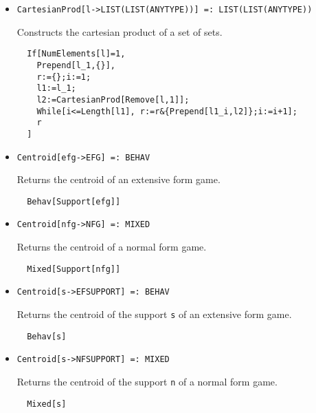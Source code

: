 \begin{itemize}
\ed


\item{}
\protect \large \begin{verbatim}
CartesianProd[l->LIST(LIST(ANYTYPE))] =: LIST(LIST(ANYTYPE)) 
\end{verbatim}\normalsize

\bd 
Constructs the cartesian product of a set of sets.  
\begin{verbatim}
  If[NumElements[l]=1,
    Prepend[l_1,{}],
    r:={};i:=1;
    l1:=l_1;
    l2:=CartesianProd[Remove[l,1]];
    While[i<=Length[l1], r:=r&{Prepend[l1_i,l2]};i:=i+1];
    r
  ]
\end{verbatim} 
\ed
	

\item{}
\protect \large \begin{verbatim}
Centroid[efg->EFG] =: BEHAV 
\end{verbatim}\normalsize

\bd 
Returns the centroid of an extensive form game.  
\begin{verbatim}
  Behav[Support[efg]]
\end{verbatim} 
\ed

\item{}
\protect \large \begin{verbatim}
Centroid[nfg->NFG] =: MIXED 
\end{verbatim}\normalsize

\bd 
Returns the centroid of a normal form game.  
\begin{verbatim}
  Mixed[Support[nfg]]
\end{verbatim} 
\ed

\item{}
\protect \large \begin{verbatim}
Centroid[s->EFSUPPORT] =: BEHAV 
\end{verbatim}\normalsize

\bd 
Returns the centroid of the support \verb+s+ of an extensive form game.  
\begin{verbatim}
  Behav[s]
\end{verbatim} 
\ed

\item{}
\protect \large \begin{verbatim}
Centroid[s->NFSUPPORT] =: MIXED 
\end{verbatim}\normalsize

\bd 
Returns the centroid of the support \verb+n+ of a normal form game.  
\begin{verbatim}
  Mixed[s]
\end{verbatim} 
\ed


\end{itemize}
